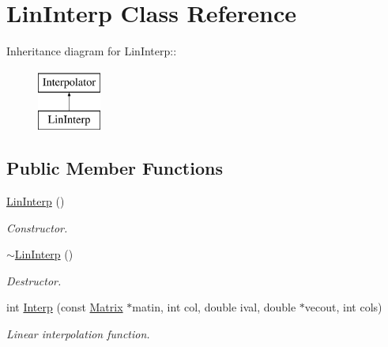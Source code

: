 \hypertarget{classLinInterp}{
\section{LinInterp Class Reference}
\label{d8/dee/classLinInterp}
}
Inheritance diagram for LinInterp::\begin{figure}[H]
\begin{center}
\leavevmode
\includegraphics[height=2cm]{d8/dee/classLinInterp}
\end{center}
\end{figure}
\subsection*{Public Member Functions}
\begin{DoxyCompactItemize}
\item 
\hypertarget{classLinInterp_a56a58464dae6196cc671749133f1de12}{
\hyperlink{classLinInterp_a56a58464dae6196cc671749133f1de12}{LinInterp} ()}
\label{d8/dee/classLinInterp_a56a58464dae6196cc671749133f1de12}

\begin{DoxyCompactList}\small\item\em Constructor. \item\end{DoxyCompactList}\item 
\hypertarget{classLinInterp_a301177227b3013bcf9ea45e1c66fc468}{
\hyperlink{classLinInterp_a301177227b3013bcf9ea45e1c66fc468}{$\sim$LinInterp} ()}
\label{d8/dee/classLinInterp_a301177227b3013bcf9ea45e1c66fc468}

\begin{DoxyCompactList}\small\item\em Destructor. \item\end{DoxyCompactList}\item 
int \hyperlink{classLinInterp_a26aeb03c387bf5c8ea5db0ed111b5cd7}{Interp} (const \hyperlink{classMatrix}{Matrix} $\ast$matin, int col, double ival, double $\ast$vecout, int cols)
\begin{DoxyCompactList}\small\item\em Linear interpolation function. \item\end{DoxyCompactList}\end{DoxyCompactItemize}


